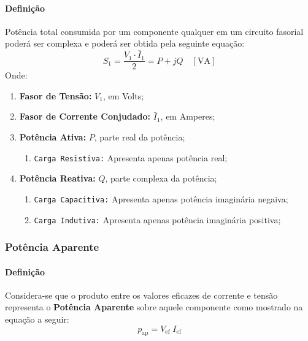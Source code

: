 \documentclass{article}
\begin{document}
            \paragraph{Definição}Potência total consumida por um componente qualquer em um circuito fasorial poderá ser complexa e poderá ser obtida pela seguinte equação:
                \begin{equation}
                    \boxed{
                        S_1 = \frac{V_1 \cdot \bar{I}_1}{2} = P + jQ \quad \left[\text{VA}\right]
                    }
                \end{equation}
            Onde:
                \begin{enumerate}
                    \item \textbf{Fasor de Tensão:} $V_1$, em Volts;

                    \item \textbf{Fasor de Corrente Conjudado:} $\bar{I}_1$, em Amperes;

                    \item \textbf{Potência Ativa:} $P$, parte real da potência;
                        \begin{enumerate}[noitemsep]
                            \item \texttt{Carga Resistiva:} Apresenta apenas potência real;
                        \end{enumerate}

                    \item \textbf{Potência Reativa:} $Q$, parte complexa da potência;
                        \begin{enumerate}[noitemsep]
                            \item \texttt{Carga Capacitiva:} Apresenta apenas potência imaginária negaiva;
                            \item \texttt{Carga Indutiva:} Apresenta apenas potência imaginária positiva;
                        \end{enumerate}
                \end{enumerate}

        \subsubsection{Potência Aparente}
            \paragraph{Definição}Considera-se que o produto entre os valores eficazes de corrente e tensão representa o \textbf{Potência Aparente} sobre aquele componente como mostrado na equação a seguir:
                \begin{equation}
                    \boxed{p_{\text{ap}} = V_{\text{ef}}\;I_{\text{ef}}}
                \end{equation}
\end{document}
